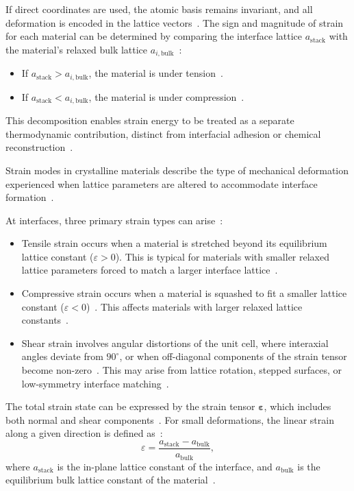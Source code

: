 If direct coordinates are used, the atomic basis remains invariant, and all deformation is encoded in the lattice vectors~\nocite{}.
The sign and magnitude of strain for each material can be determined by comparing the interface lattice $a_\mathrm{stack}$ with the material's relaxed bulk lattice $a_{i,\mathrm{bulk}}$~\nocite{}:
\begin{itemize}
    \item If $a_\mathrm{stack} > a_{i,\mathrm{bulk}}$, the material is under tension~\nocite{}.
    \item If $a_\mathrm{stack} < a_{i,\mathrm{bulk}}$, the material is under compression~\nocite{}.
\end{itemize}

This decomposition enables strain energy to be treated as a separate thermodynamic contribution, distinct from interfacial adhesion or chemical reconstruction~\nocite{}.

Strain modes in crystalline materials describe the type of mechanical deformation experienced when lattice parameters are altered to accommodate interface formation~\nocite{}.

\newpage At interfaces, three primary strain types can arise~\nocite{}:
\begin{itemize}
    \item Tensile strain occurs when a material is stretched beyond its equilibrium lattice constant ($\varepsilon > 0$). This is typical for materials with smaller relaxed lattice parameters forced to match a larger interface lattice~\nocite{}.
    \item Compressive strain occurs when a material is squashed to fit a smaller lattice constant ($\varepsilon < 0$)~\nocite{}.
    This affects materials with larger relaxed lattice constants~\nocite{}.
    \item Shear strain involves angular distortions of the unit cell, where interaxial angles deviate from $90^{\circ}$, or when off-diagonal components of the strain tensor become non-zero~\nocite{}.
    This may arise from lattice rotation, stepped surfaces, or low-symmetry interface matching~\nocite{}.
\end{itemize}
The total strain state can be expressed by the strain tensor $\boldsymbol{\varepsilon}$, which includes both normal and shear components~\nocite{}.
For small deformations, the linear strain along a given direction is defined as~\nocite{}:
\begin{equation}
    \varepsilon = \frac{a_\mathrm{stack} - a_\mathrm{bulk}}{a_\mathrm{bulk}},
\end{equation}
where $a_\mathrm{stack}$ is the in-plane lattice constant of the interface, and $a_\mathrm{bulk}$ is the equilibrium bulk lattice constant of the material~\nocite{}.

